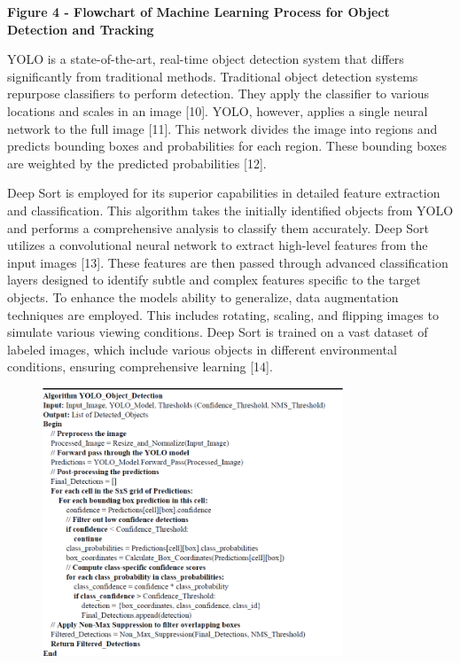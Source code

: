 \textbf{Figure 4 - Flowchart of Machine Learning Process for Object
Detection and Tracking}

YOLO is a state-of-the-art, real-time object detection system that
differs significantly from traditional methods. Traditional object
detection systems repurpose classifiers to perform detection. They apply
the classifier to various locations and scales in an image {[}10{]}.
YOLO, however, applies a single neural network to the full image
{[}11{]}. This network divides the image into regions and predicts
bounding boxes and probabilities for each region. These bounding boxes
are weighted by the predicted probabilities {[}12{]}.

Deep Sort is employed for its superior capabilities in detailed feature
extraction and classification. This algorithm takes the initially
identified objects from YOLO and performs a comprehensive analysis to
classify them accurately. Deep Sort utilizes a convolutional neural
network to extract high-level features from the input images {[}13{]}.
These features are then passed through advanced classification layers
designed to identify subtle and complex features specific to the target
objects. To enhance the model\textquotesingle s ability to generalize,
data augmentation techniques are employed. This includes rotating,
scaling, and flipping images to simulate various viewing conditions.
Deep Sort is trained on a vast dataset of labeled images, which include
various objects in different environmental conditions, ensuring
comprehensive learning {[}14{]}.

\begin{figure}[H]
	\centering
	\includegraphics[width=0.8\textwidth]{assets/16}
	\caption*{}
\end{figure}

